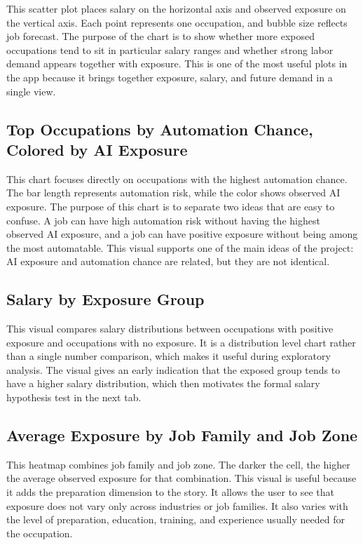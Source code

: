 \documentclass[11pt]{article}
\begin{document}
This scatter plot places salary on the horizontal axis and observed exposure on the vertical axis. Each point represents one occupation, and bubble size reflects job forecast. The purpose of the chart is to show whether more exposed occupations tend to sit in particular salary ranges and whether strong labor demand appears together with exposure. This is one of the most useful plots in the app because it brings together exposure, salary, and future demand in a single view.

\subsection*{Top Occupations by Automation Chance, Colored by AI Exposure}

This chart focuses directly on occupations with the highest automation chance. The bar length represents automation risk, while the color shows observed AI exposure. The purpose of this chart is to separate two ideas that are easy to confuse. A job can have high automation risk without having the highest observed AI exposure, and a job can have positive exposure without being among the most automatable. This visual supports one of the main ideas of the project: AI exposure and automation chance are related, but they are not identical.

\subsection*{Salary by Exposure Group}

This visual compares salary distributions between occupations with positive exposure and occupations with no exposure. It is a distribution level chart rather than a single number comparison, which makes it useful during exploratory analysis. The visual gives an early indication that the exposed group tends to have a higher salary distribution, which then motivates the formal salary hypothesis test in the next tab.

\subsection*{Average Exposure by Job Family and Job Zone}

This heatmap combines job family and job zone. The darker the cell, the higher the average observed exposure for that combination. This visual is useful because it adds the preparation dimension to the story. It allows the user to see that exposure does not vary only across industries or job families. It also varies with the level of preparation, education, training, and experience usually needed for the occupation.
\end{document}
